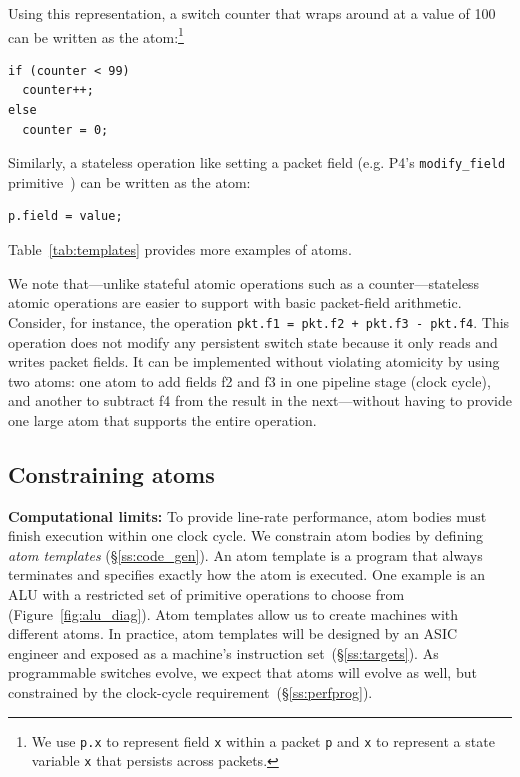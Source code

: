 Using this representation, a switch counter that wraps around at a
value of 100 can be written as the atom:\footnote{We use {\tt p.x} to
  represent field {\tt x} within a packet {\tt p} and {\tt x} to
  represent a state variable {\tt x} that persists across packets.}
\begin{lstlisting}[style=customc, numbers=none, frame=none]
if (counter < 99)
  counter++;
else
  counter = 0;
\end{lstlisting}
Similarly, a stateless operation like setting a packet field
(e.g. P4's {\tt modify\_field} primitive~\cite{p4spec}) can be written
as the atom:
\begin{lstlisting}[style=customc, numbers=none, frame=none]
  p.field = value;
\end{lstlisting}
Table~\ref{tab:templates} provides more examples of atoms.

We note that---unlike stateful atomic operations such as a counter---stateless
atomic operations are easier to support with basic packet-field arithmetic.
Consider, for instance, the operation {\tt pkt.f1 = pkt.f2 + pkt.f3 - pkt.f4}.
This operation does not modify any persistent switch state because it only
reads and writes packet fields. It can be implemented without violating
atomicity by using two atoms: one atom to add fields f2 and f3 in one pipeline
stage (clock cycle), and another to subtract f4 from the result in the
next---without having to provide one large atom that supports the entire
operation.

\subsection{Constraining atoms}
\label{s:atomConstraints}

\textbf{Computational limits:} To provide line-rate performance, atom
bodies must finish execution within one clock cycle. We
constrain atom bodies by defining {\it atom templates}
(\S\ref{ss:code_gen}).  An atom template is a program that always
terminates and specifies exactly how the atom is executed. One example
is an ALU with a restricted set of primitive operations to choose from
(Figure~\ref{fig:alu_diag}). Atom templates allow us to create
\absmachine machines with different atoms.  In practice, atom
templates will be designed by an ASIC engineer and exposed as a
machine's instruction set~(\S\ref{ss:targets}).  As programmable
switches evolve, we expect that atoms will evolve as well, but
constrained by the clock-cycle requirement~(\S\ref{ss:perfprog}).

